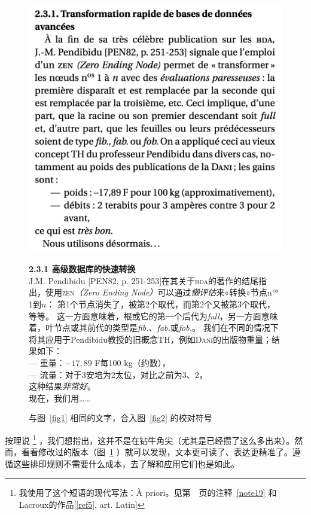 \begin{figure}
    \centering
    \includegraphics[width = .75\linewidth]{img/3.png}

\begin{bil}
    \textbf{2.3.1 \quad 高级数据库的快速转换}\\
    J.M. Pendibidu [PEN82, p. 251-253]在其关于\textsc{bda}的著作的结尾指出，使用\textsc{zen}\emph{（Zero Ending Node）}可以通过\emph{懒评估}来«转换»节点n$^{\rm os}$ 1到$n$：
    第1个节点消失了，被第2个取代，而第2个又被第3个取代，等等。
    这一方面意味着，根或它的第一个后代为\emph{full}，另一方面意味着，叶节点或其前代的类型是\emph{fib.}、\emph{fab.}或\emph{fob.}。
    我们在不同的情况下将其应用于Pendibidu教授的旧概念TH，例如\textsc{Dani}的出版物重量；结果如下：\\
    \mbox{\qquad} ---  重量：$-17,89$ F每100 kg（约数），\\
    \mbox{\qquad} ---  流量：对于3安培为2太位，对比之前为3、2，\\
    这种结果\emph{非常好}。\\
    现在，我们用……
\end{bil}

    \caption{与图~\ref{fig1} 相同的文字，合入图~\ref{fig2} 的校对符号}
    \label{fig3}
\end{figure}

按理说
    \footnote{我使用了这个短语的现代写法：À priori。见第~\pageref{note19}~页的注释~\ref{note19} 和Lacroux的作品[\ref{ref5}, art. Latin]}
，我们想指出，这并不是在钻牛角尖（尤其是已经攒了这么多出来）。然而，看看修改过的版本（图~\ref{fig3} ）就可以发现，文本更可读了、表达更精准了。遵循这些排印规则不需要什么成本，去了解和应用它们也是如此。

